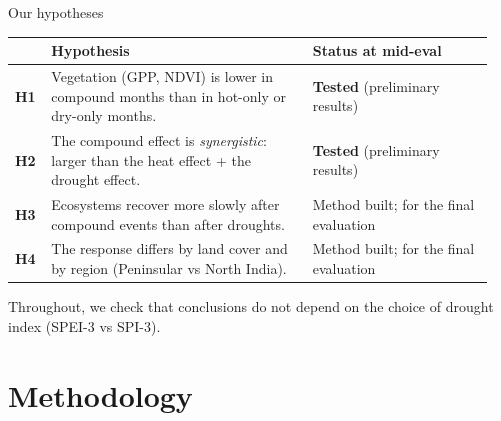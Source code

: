 \documentclass[11pt,aspectratio=169]{beamer}
\begin{document}
\begin{frame}{Our hypotheses}
  \small
  \renewcommand{\arraystretch}{1.25}
  \begin{tabular}{@{}L{0.07\linewidth}L{0.52\linewidth}L{0.36\linewidth}@{}}
    \toprule
    & \textbf{Hypothesis} & \textbf{Status at mid-eval} \\
    \midrule
    \textbf{H1} & Vegetation (GPP, NDVI) is lower in compound months than in
      hot-only or dry-only months. & \textbf{Tested} (preliminary results) \\
    \textbf{H2} & The compound effect is \emph{synergistic}: larger than the
      heat effect + the drought effect. & \textbf{Tested} (preliminary results) \\
    \textbf{H3} & Ecosystems recover more slowly after compound events than
      after droughts. & Method built; for the final evaluation \\
    \textbf{H4} & The response differs by land cover and by region
      (Peninsular vs North India). & Method built; for the final evaluation \\
    \bottomrule
  \end{tabular}

  \vspace{6pt}
  \footnotesize Throughout, we check that conclusions do not depend on the
  choice of drought index (SPEI-3 vs SPI-3).
\end{frame}

\section{Methodology}
\end{document}
